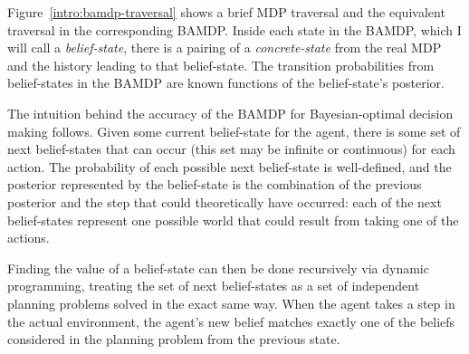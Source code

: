 Figure~\ref{intro:bamdp-traversal} shows a brief MDP traversal and the equivalent traversal in the corresponding BAMDP. Inside each state in the BAMDP, which I will call a \emph{belief-state}, there is a pairing of a \emph{concrete-state} from the real MDP and the history leading to that belief-state. The transition probabilities from belief-states in the BAMDP are known functions of the belief-state's posterior.

The intuition behind the accuracy of the BAMDP for Bayesian-optimal decision making follows. Given some current belief-state for the agent, there is some set of next belief-states that can occur (this set may be infinite or continuous) for each action. The probability of each possible next belief-state is well-defined, and the posterior represented by the belief-state is the combination of the previous posterior and the step that could theoretically have occurred: each of the next belief-states represent one possible world that could result from taking one of the actions.



Finding the value of a belief-state can then be done recursively via dynamic programming, treating the set of next belief-states as a set of independent planning problems solved in the exact same way. When the agent takes a step in the actual environment, the agent's new belief matches exactly one of the beliefs considered in the planning problem from the previous state.


